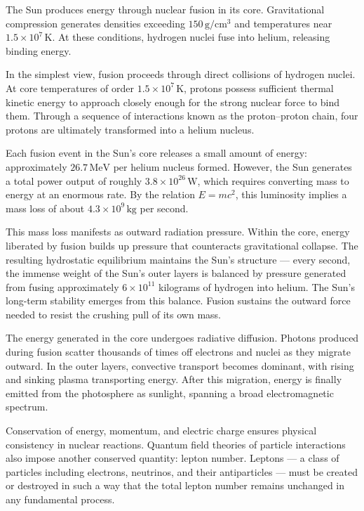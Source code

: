 The Sun produces energy through nuclear fusion in its core. Gravitational compression generates densities exceeding $150\,\text{g}/\text{cm}^3$ and temperatures near $1.5 \times 10^7\,\text{K}$. At these conditions, hydrogen nuclei fuse into helium, releasing binding energy.

In the simplest view, fusion proceeds through direct collisions of hydrogen nuclei. At core temperatures of order $1.5 \times 10^7\,\text{K}$, protons possess sufficient thermal kinetic energy to approach closely enough for the strong nuclear force to bind them. Through a sequence of interactions known as the proton–proton chain, four protons are ultimately transformed into a helium nucleus. 

Each fusion event in the Sun's core releases a small amount of energy: approximately $26.7\,\text{MeV}$ per helium nucleus formed. However, the Sun generates a total power output of roughly $3.8 \times 10^{26}\,\text{W}$, which requires converting mass to energy at an enormous rate. By the relation $E = mc^2$, this luminosity implies a mass loss of about $4.3 \times 10^9\,\text{kg}$ per second.

This mass loss manifests as outward radiation pressure. Within the core, energy liberated by fusion builds up pressure that counteracts gravitational collapse. The resulting hydrostatic equilibrium maintains the Sun's structure — every second, the immense weight of the Sun's outer layers is balanced by pressure generated from fusing approximately $6 \times 10^{11}$ kilograms of hydrogen into helium. The Sun's long-term stability emerges from this balance. Fusion sustains the outward force needed to resist the crushing pull of its own mass.

The energy generated in the core undergoes radiative diffusion. Photons produced during fusion scatter thousands of times off electrons and nuclei as they migrate outward. In the outer layers, convective transport becomes dominant, with rising and sinking plasma transporting energy. After this migration, energy is finally emitted from the photosphere as sunlight, spanning a broad electromagnetic spectrum.

Conservation of energy, momentum, and electric charge ensures physical consistency in nuclear reactions. Quantum field theories of particle interactions also impose another conserved quantity: lepton number. Leptons — a class of particles including electrons, neutrinos, and their antiparticles — must be created or destroyed in such a way that the total lepton number remains unchanged in any fundamental process.

